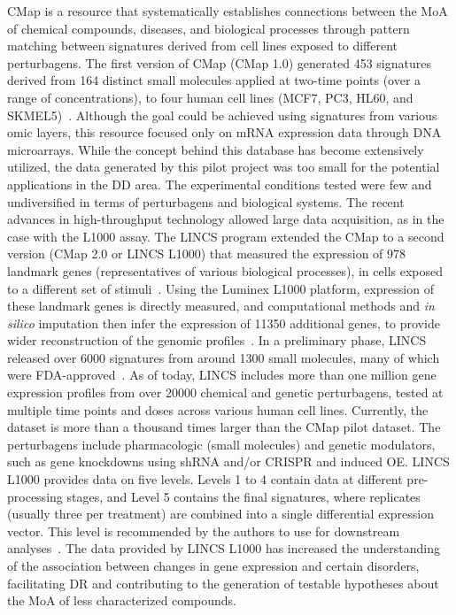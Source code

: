 \gls{CMap} is a resource that systematically establishes connections between the \gls{MoA} of chemical compounds, diseases, and biological processes through pattern matching between signatures derived from cell lines exposed to different perturbagens. The first version of \gls{CMap} (\gls{CMap} 1.0) generated 453 signatures derived from 164 distinct small molecules applied at two-time points (over a range of concentrations), to four human cell lines (MCF7, PC3, HL60, and SKMEL5)~\cite{RN34}.
Although the goal could be achieved using signatures from various omic layers, this resource focused only on \gls{mRNA} expression data through \gls{DNA} microarrays. While the concept behind this database has become extensively utilized, the data generated by this pilot project was too small for the potential applications in the \gls{DD} area. The experimental conditions tested were few and undiversified in terms of perturbagens and biological systems. 
The recent advances in high-throughput technology allowed large data acquisition, as in the case with the L1000 assay.
The \gls{LINCS} program extended the \gls{CMap} to a second version (\gls{CMap} 2.0 or \gls{LINCS} L1000) that measured the expression of 978 landmark genes (representatives of various biological processes), in cells exposed to a different set of stimuli~\cite{RN30}. 
Using the Luminex L1000 platform, expression of these landmark genes is directly measured, and computational methods and \textit{in silico} imputation then infer the expression of 11350 additional genes, to provide wider reconstruction of the genomic profiles~\cite{RN30}. 
In a preliminary phase, \gls{LINCS} released over 6000 signatures from around 1300 small molecules, many of which were FDA-approved~\cite{RN115}. 
As of today, \gls{LINCS} includes more than one million gene expression profiles from over 20000 chemical and genetic perturbagens, tested at multiple time points and doses across various human cell lines. 
Currently, the dataset is more than a thousand times larger than the \gls{CMap} pilot dataset. 
The perturbagens include pharmacologic (small molecules) and genetic modulators, such as gene knockdowns using \gls{shRNA} and/or CRISPR and induced \gls{OE}. 
\gls{LINCS} L1000 provides data on five levels. 
Levels 1 to 4 contain data at different pre-processing stages, and Level 5 contains the final signatures, where replicates (usually three per treatment) are combined into a single differential expression vector. 
This level is recommended by the authors to use for downstream analyses~\cite{RN30}. 
The data provided by \gls{LINCS} L1000 has increased the understanding of the association between changes in gene expression and certain disorders, facilitating \gls{DR} and contributing to the generation of testable hypotheses about the \gls{MoA} of less characterized compounds. 
